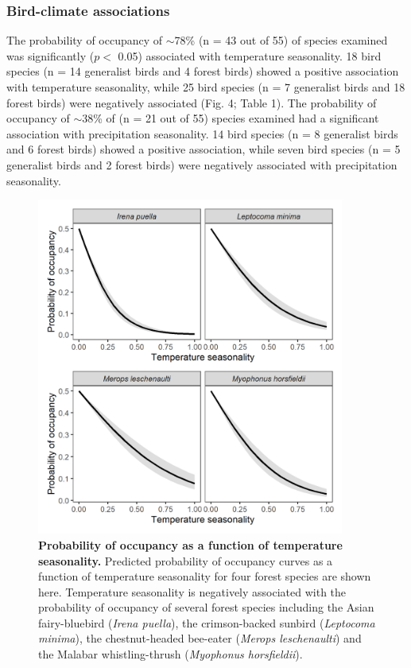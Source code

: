 \subsubsection*{Bird-climate associations}

The probability of occupancy of $\sim$78\% (n = 43 out of 55) of species examined was significantly ($p <$ 0.05) associated with temperature seasonality.
18 bird species (n = 14 generalist birds and 4 forest birds) showed a positive association with temperature seasonality, while 25 bird species (n = 7 generalist birds and 18 forest birds) were negatively associated (Fig. 4; Table 1).
The probability of occupancy of $\sim$38\% of (n = 21 out of 55) species examined had a significant association with precipitation seasonality.
14 bird species (n = 8 generalist birds and 6 forest birds) showed a positive association, while seven bird species (n = 5 generalist birds and 2 forest birds) were negatively associated with precipitation seasonality.

\begin{figure}[t!]
    \centering
    \includegraphics[width=0.9\textwidth]{figures/hillybirds/fig_05.png}
    \caption{
        \textbf{Probability of occupancy as a function of temperature seasonality.}
        Predicted probability of occupancy curves as a function of temperature seasonality for four forest species are shown here. 
        Temperature seasonality is negatively associated with the probability of occupancy of several forest species including the Asian fairy-bluebird (\textit{Irena puella}), the crimson-backed sunbird (\textit{Leptocoma minima}), the chestnut-headed bee-eater (\textit{Merops leschenaulti}) and the Malabar whistling-thrush (\textit{Myophonus horsfieldii}).
    }
    \label{hilly_fig_05}
\end{figure}


